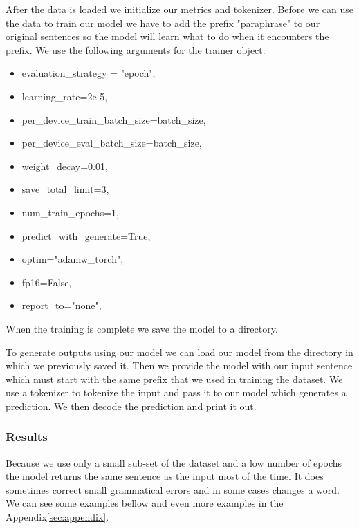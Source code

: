 \documentclass[fleqn,moreauthors,10pt]{ds_report}
\begin{document}
After the data is loaded we initialize our metrics and tokenizer. Before we can use the data to train our model we have to add the prefix "paraphrase" to our original sentences so the model will learn what to do when it encounters the prefix. We use the following arguments for the trainer object: 

\begin{itemize}[itemsep=2pt]
    \item evaluation\_strategy = "epoch",
    \item learning\_rate=2e-5,
    \item per\_device\_train\_batch\_size=batch\_size,
    \item per\_device\_eval\_batch\_size=batch\_size,
    \item weight\_decay=0.01,
    \item save\_total\_limit=3,
    \item num\_train\_epochs=1,
    \item predict\_with\_generate=True,
    \item optim="adamw\_torch",
    \item fp16=False,
    \item report\_to="none",
\end{itemize}

When the training is complete we save the model to a directory. 

To generate outputs using our model we can load our model from the directory in which we previously saved it. Then we provide the model with our input sentence which must start with the same prefix that we used in training the dataset. We use a tokenizer to tokenize the input and pass it to our model which generates a prediction. We then decode the prediction and print it out. 

\subsubsection{Results}
Because we use only a small sub-set of the dataset and a low number of epochs the model returns the same sentence as the input most of the time. It does sometimes correct small grammatical errors and in some cases changes a word. We can see some examples bellow and even more examples in the Appendix\ref{sec:appendix}.
\end{document}
